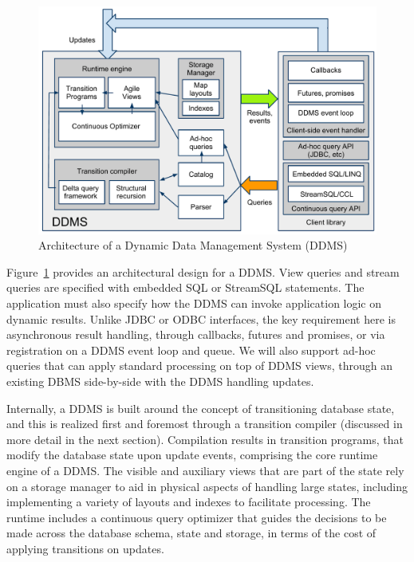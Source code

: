 \begin{figure}
\begin{center}
\includegraphics[scale=0.35]{graphics/CIDRarch.pdf}
\end{center}
\caption{Architecture of a Dynamic Data Management System (DDMS)}
\label{fig:ddmsarch}
\end{figure}


Figure~\ref{fig:ddmsarch} provides an architectural design for a DDMS. View
queries and stream queries are specified with embedded SQL or StreamSQL
statements. The application must also specify how the DDMS can invoke
application logic on dynamic results. Unlike JDBC or ODBC interfaces, the key
requirement here is asynchronous result handling, through callbacks, futures and
promises, or via registration on a DDMS event loop and queue. We will also
support ad-hoc queries that can apply standard processing on top of DDMS views,
through an existing DBMS side-by-side with the DDMS handling updates.











Internally, a DDMS is built around the concept of transitioning database state,
and this is realized first and foremost through a transition compiler (discussed
in more detail in the next section). Compilation results in transition programs,
that modify the database state upon update events, comprising the core runtime
engine of a DDMS. The visible and auxiliary views that are part of the state
rely on a storage manager to aid in physical aspects of handling large states,
including implementing a variety of layouts and indexes to facilitate
processing. The runtime includes a continuous query optimizer that guides the
decisions to be made across the database schema, state and storage, in terms of
the cost of applying transitions on updates.










